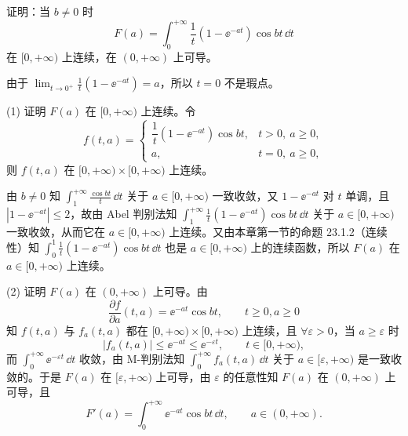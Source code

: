 \begin{xexample}[23.2.7]
证明：当 $b\neq0$ 时
\[
  F(a)=\int_0^{+\infty}\frac1t(1-\ee^{-at})\cos bt\,\dd t
\]
在 $[0,+\infty)$ 上连续，在 $(0,+\infty)$ 上可导。
\end{xexample}
\begin{xproof}
由于 $\displaystyle\lim_{t\to0^+}\frac1t(1-\ee^{-at})=a$，所以 $t=0$ 不是瑕点。

(1) 证明 $F(a)$ 在 $[0,+\infty)$ 上连续。令
\[
  f(t,a)=
  \begin{cases}
    \dfrac1t(1-\ee^{-at})\cos bt,&t>0,\ a\geqslant0,\\
    a,&t=0,\ a\geqslant0,
  \end{cases}
\]
则 $f(t,a)$ 在 $[0,+\infty)\times[0,+\infty)$ 上连续。

由 $b\neq0$ 知 $\displaystyle\int_1^{+\infty}\frac{\cos bt}{t}\,\dd t$ 关于 $a\in[0,+\infty)$ 一致收敛，又 $1-\ee^{-at}$ 对 $t$ 单调，且 $|1-\ee^{-at}|\leqslant2$，故由 Abel 判别法知 $\displaystyle\int_1^{+\infty}\frac1t(1-\ee^{-at})\cos bt\,\dd t$ 关于 $a\in[0,+\infty)$ 一致收敛，从而它在 $a\in[0,+\infty)$ 上连续。又由本章第一节的命题 23.1.2（连续性）知 $\displaystyle\int_0^1\frac1t(1-\ee^{-at})\cos bt\,\dd t$ 也是 $a\in[0,+\infty)$ 上的连续函数，所以 $F(a)$ 在 $a\in[0,+\infty)$ 上连续。

(2) 证明 $F(a)$ 在 $(0,+\infty)$ 上可导。由
\[
  \frac{\partial f}{\partial a}(t,a)=\ee^{-at}\cos bt,\qquad t\geqslant0,a\geqslant0
\]
知 $f(t,a)$ 与 $f_a(t,a)$ 都在 $[0,+\infty)\times[0,+\infty)$ 上连续，且 $\forall\varepsilon>0$，当 $a\geqslant\varepsilon$ 时
\[
  |f_a(t,a)|\leqslant\ee^{-at}\leqslant\ee^{-\varepsilon t},\qquad t\in[0,+\infty),
\]
而 $\displaystyle\int_0^{+\infty}\ee^{-\varepsilon t}\,\dd t$ 收敛，由 M-判别法知 $\displaystyle\int_0^{+\infty}f_a(t,a)\,\dd t$ 关于 $a\in[\varepsilon,+\infty)$ 是一致收敛的。于是 $F(a)$ 在 $[\varepsilon,+\infty)$ 上可导，由 $\varepsilon$ 的任意性知 $F(a)$ 在 $(0,+\infty)$ 上可导，且
\begin{equation}
  F'(a)=\int_0^{+\infty}\ee^{-at}\cos bt\,\dd t,\qquad a\in(0,+\infty).
  \tag{23.7}
\end{equation}
\end{xproof}

